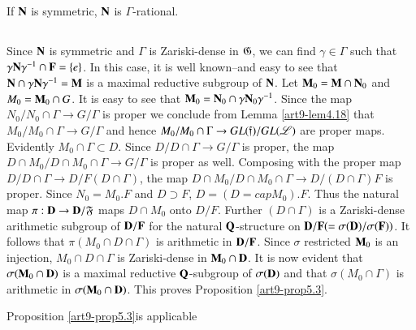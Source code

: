 \begin{proposition}\label{art9-prop5.3}
If $\mathbf{N}$ is symmetric, $\mathbf{N}$ is $\Gamma$-rational.
\end{proposition}

\subsection{}\label{art9-subsec5.4}
Since $\mathbf{N}$ is symmetric and $\Gamma$ is Zariski-dense in $\mathfrak{G}$, we can find $\gamma \in\Gamma$ such that $\gamma \mathbf{N} \gamma^{-1} \cap\mathbf{F} = \{e\}$. In this case, it is well known--and easy to see that $\mathbf{N} \cap \gamma \mathbf{N} \gamma^{-1} = \mathbf{M}$ is a maximal reductive subgroup of $\mathbf{N}$. Let $\mathbf{M}_0 = \mathbf{M} \cap \mathbf{N}_0$ and $M_0 = \mathbf{M}_0 \cap G$. It is easy to see that $\mathbf{M}_0 = \mathbf{N}_0 \cap \gamma \mathbf{N}_0 \gamma^{-1}$. Since the map $N_0/ N_0 \cap \Gamma\to G/ \Gamma $ is proper we conclude from Lemma \ref{art9-lem4.18} that $M_0 / M_0 \cap \Gamma \to G/\Gamma$ and hence $M_0 / M_0 \cap \Gamma \to G  L(\mathfrak{f}) / GL (\mathscr{L})$ are proper maps. Evidently $M_0 \cap \Gamma \subset D$. Since $D/ D \cap \Gamma \to G / \Gamma$ is proper, the map $D \cap M_0 / D \cap M_0 \cap \Gamma \to G / \Gamma$ is proper as well. Composing with the proper map $D/D \cap \Gamma \to D/ F (D \cap \Gamma)$, the map $D \cap M_0 / D \cap M_0 \cap \Gamma \to D / (D \cap \Gamma) F$ is proper. Since $N_0 = M_0 . F$ and $D \supset F$, $D = (D =cap M_0) . F$. Thus the natural map $\pi : \mathbf{D} \to \mathbf{D} / \mathfrak{F}$ maps $D \cap M_0$  onto $D/ F$. Further $(D \cap \Gamma)$ is a Zariski-dense arithmetic subgroup of $\mathbf{D}/\mathbf{F}$ for the natural $\mathbf{Q}$-structure on $\mathbf{D} / \mathbf{F} (= \sigma (\mathbf{D})/ \sigma (\mathbf{F}))$. It follows that $\pi (M_0 \cap D \cap \Gamma)$ is arithmetic in $\mathbf{D}/\mathbf{F}$. Since $\sigma$ restricted $\mathbf{M}_0$ is an injection, $M_0 \cap D \cap \Gamma$ is Zariski-dense in $\mathbf{M}_0 \cap \mathbf{D}$. It is now evident that $\sigma (\mathbf{M}_0 \cap \mathbf{D})$ is a maximal reductive $\mathbf{Q}$-subgroup of $\sigma (\mathbf{D})$ and that $\sigma (M_0 \cap \Gamma)$ is arithmetic in $\sigma (\mathbf{M}_0 \cap \mathbf{D})$. This proves Proposition \ref{art9-prop5.3}.

\begin{remarks}\label{art9-remarks5.5}
Proposition \ref{art9-prop5.3}\pageoriginale is applicable
\end{remarks}
















\begin{thebibliography}{99}
\end{thebibliography}

